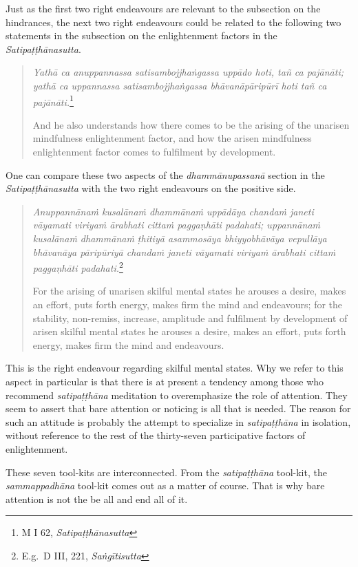 Just as the first two right endeavours are relevant to the subsection on the hindrances, the next two right endeavours could be related to the following two statements in the subsection on the enlightenment factors in the \emph{Satipaṭṭhānasutta}.

\begin{quote}
\emph{Yathā ca anuppannassa satisambojjhaṅgassa uppādo hoti, tañ ca pajānāti; yathā ca uppannassa satisambojjhaṅgassa bhāvanāpāripūrī hoti tañ ca pajānāti.}\footnote{M I 62, \emph{Satipaṭṭhānasutta}}

And he also understands how there comes to be the arising of the unarisen mindfulness enlightenment factor, and how the arisen mindfulness enlightenment factor comes to fulfilment by development.
\end{quote}

One can compare these two aspects of the \emph{dhammānupassanā} section in the \emph{Satipaṭṭhānasutta} with the two right endeavours on the positive side.

\begin{quote}
\emph{Anuppannānaṁ kusalānaṁ dhammānaṁ uppādāya chandaṁ janeti vāyamati viriyaṁ ārabhati cittaṁ paggaṇhāti padahati; uppannānaṁ kusalānaṁ dhammānaṁ ṭhitiyā asammosāya bhiyyobhāvāya vepullāya bhāvanāya pāripūriyā chandaṁ janeti vāyamati viriyaṁ ārabhati cittaṁ paggaṇhāti padahati.}\footnote{E.g.~D III, 221, \emph{Saṅgītisutta}}

For the arising of unarisen skilful mental states he arouses a desire, makes an effort, puts forth energy, makes firm the mind and endeavours; for the stability, non-remiss, increase, amplitude and fulfilment by development of arisen skilful mental states he arouses a desire, makes an effort, puts forth energy, makes firm the mind and endeavours.
\end{quote}

This is the right endeavour regarding skilful mental states. Why we refer to this aspect in particular is that there is at present a tendency among those who recommend \emph{satipaṭṭhāna} meditation to overemphasize the role of attention. They seem to assert that bare attention or noticing is all that is needed. The reason for such an attitude is probably the attempt to specialize in \emph{satipaṭṭhāna} in isolation, without reference to the rest of the thirty-seven participative factors of enlightenment.

These seven tool-kits are interconnected. From the \emph{satipaṭṭhāna} tool-kit, the \emph{sammappadhāna} tool-kit comes out as a matter of course. That is why bare attention is not the be all and end all of it.

